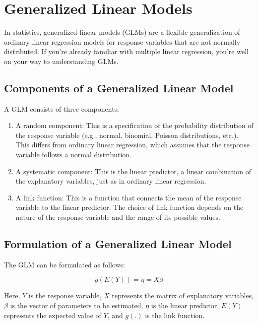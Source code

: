 \chapter{Generalized Linear Models}

In statistics, generalized linear models (GLMs) are a flexible
generalization of ordinary linear regression models for response
variables that are not normally distributed. If you're already
familiar with multiple linear regression, you're well on your way to
understanding GLMs. 

\section{Components of a Generalized Linear Model}

A GLM consists of three components:

\begin{enumerate}
    \item A random component: This is a specification of the
      probability distribution of the response variable (e.g., normal,
      binomial, Poisson distributions, etc.). This differs from
      ordinary linear regression, which assumes that the response
      variable follows a normal distribution.
    \item A systematic component: This is the linear predictor, a
      linear combination of the explanatory variables, just as in
      ordinary linear regression.
    \item A link function: This is a function that connects the mean
      of the response variable to the linear predictor. The choice of
      link function depends on the nature of the response variable and
      the range of its possible values.
\end{enumerate}

\section{Formulation of a Generalized Linear Model}

The GLM can be formulated as follows:

\begin{equation}
g(E(Y)) = \eta = X\beta
\end{equation}

Here, $Y$ is the response variable, $X$ represents the matrix of
explanatory variables, $\beta$ is the vector of parameters to be
estimated, $\eta$ is the linear predictor, $E(Y)$ represents the
expected value of $Y$, and $g(.)$ is the link function.

